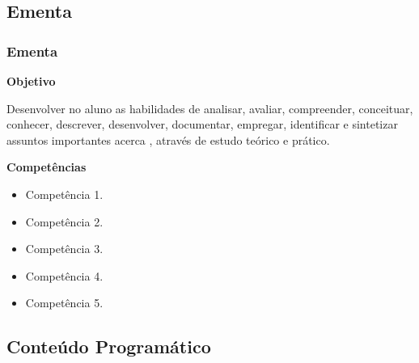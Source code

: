 \subsection[Ementa]{Ementa}\label{subsec:plano-ensino-ementa}



\begin{frame}[t]\frametitle{Ementa}

  \justifying{}

  \textbf{Objetivo}

  Desenvolver no aluno as habilidades de analisar, avaliar, compreender, conceituar, conhecer, descrever, desenvolver, documentar, empregar, identificar e sintetizar assuntos importantes acerca \textbf{\curso}, através de estudo teórico e prático.

  \vspace*{\fill}

  \textbf{Competências}

  \begin{itemize}
    \justifying{}
    \item Competência 1.
    \item Competência 2.
    \item Competência 3.
    \item Competência 4.
    \item Competência 5.
  \end{itemize}

\end{frame}



\subsection[Conteúdo Programático]{Conteúdo Programático}\label{subsec:plano-ensino-conteudo}



